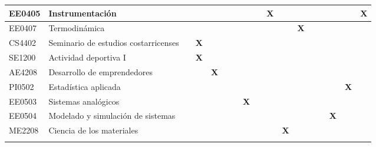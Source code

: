 \begin{center}
\begin{adjustbox}{max width=\textwidth,max totalheight=.82\textheight}
\begin{tabular}{|l|p{4.6cm}|c|c|c|c|c|c|c|c|c|c|c|c|c|c|c|}
EE0405 & Instrumentación & \textbf{ } & \textbf{ } & \textbf{ } & \textbf{ } & \textbf{ } & \textbf{ } & \textbf{ } & \textbf{X} & \textbf{ } & \textbf{ } & \textbf{ } & \textbf{ } & \textbf{ } & \textbf{ } & \textbf{X} \\ \hline
\rowcolor{azulTabla}
EE0407 & Termodinámica & \textbf{ } & \textbf{ } & \textbf{ } & \textbf{ } & \textbf{ } & \textbf{ } & \textbf{ } & \textbf{ } & \textbf{ } & \textbf{X} & \textbf{ } & \textbf{ } & \textbf{ } & \textbf{ } & \textbf{ } \\ \hline
CS4402 & Seminario de estudios costarricenses & \textbf{ } & \textbf{X} & \textbf{ } & \textbf{ } & \textbf{ } & \textbf{ } & \textbf{ } & \textbf{ } & \textbf{ } & \textbf{ } & \textbf{ } & \textbf{ } & \textbf{ } & \textbf{ } & \textbf{ } \\ \hline
\rowcolor{azulTabla}
SE1200 & Actividad deportiva I & \textbf{ } & \textbf{X} & \textbf{ } & \textbf{ } & \textbf{ } & \textbf{ } & \textbf{ } & \textbf{ } & \textbf{ } & \textbf{ } & \textbf{ } & \textbf{ } & \textbf{ } & \textbf{ } & \textbf{ } \\ \hline
AE4208 & Desarrollo de emprendedores & \textbf{ } & \textbf{ } & \textbf{X} & \textbf{ } & \textbf{ } & \textbf{ } & \textbf{ } & \textbf{ } & \textbf{ } & \textbf{ } & \textbf{ } & \textbf{ } & \textbf{ } & \textbf{ } & \textbf{ } \\ \hline
\rowcolor{azulTabla}
PI0502 & Estadística aplicada & \textbf{ } & \textbf{ } & \textbf{ } & \textbf{ } & \textbf{ } & \textbf{ } & \textbf{ } & \textbf{ } & \textbf{ } & \textbf{ } & \textbf{ } & \textbf{ } & \textbf{ } & \textbf{X} & \textbf{ } \\ \hline
EE0503 & Sistemas analógicos & \textbf{ } & \textbf{ } & \textbf{ } & \textbf{ } & \textbf{ } & \textbf{X} & \textbf{ } & \textbf{ } & \textbf{ } & \textbf{ } & \textbf{ } & \textbf{ } & \textbf{ } & \textbf{ } & \textbf{ } \\ \hline
\rowcolor{azulTabla}
EE0504 & Modelado y simulación de sistemas & \textbf{ } & \textbf{ } & \textbf{ } & \textbf{ } & \textbf{ } & \textbf{ } & \textbf{ } & \textbf{ } & \textbf{ } & \textbf{ } & \textbf{ } & \textbf{ } & \textbf{X} & \textbf{ } & \textbf{ } \\ \hline
ME2208 & Ciencia de los materiales & \textbf{ } & \textbf{ } & \textbf{ } & \textbf{ } & \textbf{ } & \textbf{ } & \textbf{ } & \textbf{ } & \textbf{X} & \textbf{ } & \textbf{ } & \textbf{ } & \textbf{ } & \textbf{ } & \textbf{ } \\ \hline
\rowcolor{azulTabla}

\end{tabular}
\end{adjustbox}
\end{center}
